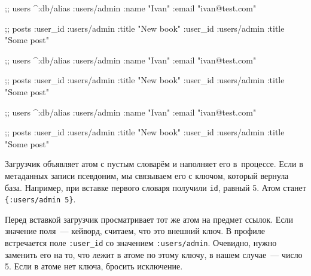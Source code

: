 \ifnarrow

\begin{english}
  \begin{clojure}
;; users
^{:db/alias :users/admin}
 {:name "Ivan" :email "ivan@test.com"}

;; posts
{:user_id :users/admin
 :title "New book"}
{:user_id :users/admin
 :title "Some post"}
  \end{clojure}
\end{english}

\else

\iflarge

\begin{english}
  \begin{clojure}
;; users
^{:db/alias :users/admin}
 {:name "Ivan" :email "ivan@test.com"}
  \end{clojure}
\end{english}

\pagebreaklarge

\begin{english}
  \begin{clojure}
;; posts
{:user_id :users/admin :title "New book"}
{:user_id :users/admin :title "Some post"}
  \end{clojure}
\end{english}

\else

\begin{english}
  \begin{clojure}
;; users
^{:db/alias :users/admin}
 {:name "Ivan" :email "ivan@test.com"}

;; posts
{:user_id :users/admin :title "New book"}
{:user_id :users/admin :title "Some post"}
  \end{clojure}
\end{english}

\fi

\fi

Загрузчик объявляет атом с пустым словарём и наполняет его в~процессе. Если в
метаданных записи псевдоним, мы связываем его с ключом, который вернула
база. Например, при вставке первого словаря получили \verb|id|, равный 5. Атом
станет \verb|{:users/admin 5}|.

Перед вставкой загрузчик просматривает тот же атом на предмет ссылок. Если
значение поля~--- кейворд, считаем, что это внешний ключ. В профиле встречается
поле \verb|:user_id| со значением \verb|:users/admin|. Очевидно, нужно заменить
его на то, что лежит в атоме по этому ключу, в нашем случае~--- число 5. Если в
атоме нет ключа, бросить исключение.

